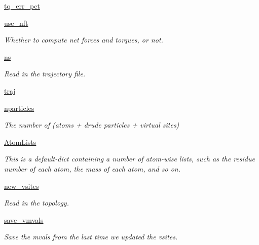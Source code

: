 \begin{DoxyCompactItemize}
\hyperlink{classforcebalance_1_1abinitio_1_1AbInitio_a9954395e5bb893da066002238d7dbacd}{tq\-\_\-err\-\_\-pct}
\item 
\hyperlink{classforcebalance_1_1abinitio_1_1AbInitio_ad19dc7dc7d2593c143700182dc614435}{use\-\_\-nft}
\begin{DoxyCompactList}\small\item\em \-Whether to compute net forces and torques, or not. \end{DoxyCompactList}\item 
\hyperlink{classforcebalance_1_1abinitio_1_1AbInitio_a86f4e2b085f139886d54855f432a2672}{ns}
\begin{DoxyCompactList}\small\item\em \-Read in the trajectory file. \end{DoxyCompactList}\item 
\hyperlink{classforcebalance_1_1abinitio_1_1AbInitio_a112c4e1af07517633c5c149c07c4aa8c}{traj}
\item 
\hyperlink{classforcebalance_1_1abinitio_1_1AbInitio_ad3dfbd9d397bb7b2bbc3fe0374291e34}{nparticles}
\begin{DoxyCompactList}\small\item\em \-The number of (atoms + drude particles + virtual sites) \end{DoxyCompactList}\item 
\hyperlink{classforcebalance_1_1abinitio_1_1AbInitio_a3eceb701813ccb83d11a0dc71df835b7}{\-Atom\-Lists}
\begin{DoxyCompactList}\small\item\em \-This is a default-\/dict containing a number of atom-\/wise lists, such as the residue number of each atom, the mass of each atom, and so on. \end{DoxyCompactList}\item 
\hyperlink{classforcebalance_1_1abinitio_1_1AbInitio_abab8d9c8cbf4eddc5a3c10b6240423e6}{new\-\_\-vsites}
\begin{DoxyCompactList}\small\item\em \-Read in the topology. \end{DoxyCompactList}\item 
\hyperlink{classforcebalance_1_1abinitio_1_1AbInitio_a430661954fff8c1979eb9ac28523bb5e}{save\-\_\-vmvals}
\begin{DoxyCompactList}\small\item\em \-Save the mvals from the last time we updated the vsites. \end{DoxyCompactList}\item 

\end{DoxyCompactItemize}
